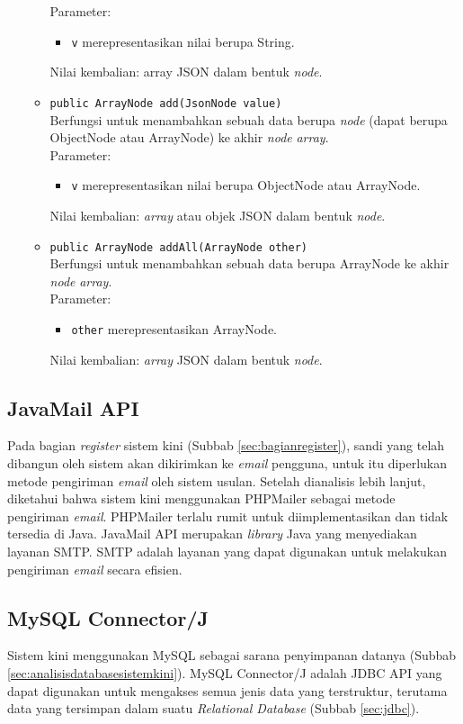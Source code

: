 \begin{enumerate}
\begin{itemize}
			Parameter:
				\begin{itemize}
					\item \texttt{v} merepresentasikan nilai berupa String.
				\end{itemize}
			Nilai kembalian: array JSON dalam bentuk \textit{node}.
			\item \texttt{public ArrayNode add(JsonNode value)}\\
			Berfungsi untuk menambahkan sebuah data berupa \textit{node} (dapat berupa ObjectNode atau ArrayNode) ke akhir \textit{node} \textit{array}.\\
			Parameter:
				\begin{itemize}
					\item \texttt{v} merepresentasikan nilai berupa ObjectNode atau ArrayNode.
				\end{itemize}
			Nilai kembalian: \textit{array} atau objek JSON dalam bentuk \textit{node}.
			\item \texttt{public ArrayNode addAll(ArrayNode other)}\\
			Berfungsi untuk menambahkan sebuah data berupa ArrayNode ke akhir \textit{node} \textit{array}.\\
			Parameter:
				\begin{itemize}
					\item \texttt{other} merepresentasikan ArrayNode.
				\end{itemize}
			Nilai kembalian: \textit{array} JSON dalam bentuk \textit{node}.
		\end{itemize}
\end{enumerate}
 
\subsection{JavaMail API}
\label{sec:javamailapi}
Pada bagian \textit{register} sistem kini (Subbab \ref{sec:bagianregister}), sandi yang telah dibangun oleh sistem akan dikirimkan ke \textit{email} pengguna, untuk itu diperlukan metode pengiriman \textit{email} oleh sistem usulan. Setelah dianalisis lebih lanjut, diketahui bahwa sistem kini menggunakan PHPMailer\cite{github} sebagai metode pengiriman \textit{email}. PHPMailer terlalu rumit untuk diimplementasikan dan tidak tersedia di Java. JavaMail API merupakan \textit{library} Java yang menyediakan layanan SMTP\cite{javamailapi}. SMTP adalah layanan yang dapat digunakan untuk melakukan pengiriman \textit{email} secara efisien\cite{smtp}.

\subsection{MySQL Connector/J}
\label{sec:mysqlconnector/j}
Sistem kini menggunakan MySQL sebagai sarana penyimpanan datanya (Subbab \ref{sec:analisisdatabasesistemkini}). MySQL Connector/J adalah JDBC API yang dapat digunakan untuk mengakses semua jenis data yang terstruktur, terutama data yang tersimpan dalam suatu \textit{Relational Database} (Subbab \ref{sec:jdbc}). 

